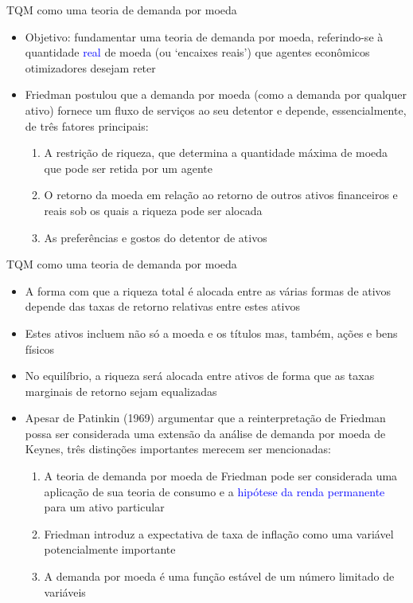 \documentclass[10pt]{beamer}
\begin{document}
\begin{frame}{TQM como uma teoria de demanda por moeda}
    \begin{itemize}
        \item Objetivo: fundamentar uma teoria de demanda por moeda, referindo-se à quantidade \textcolor{blue}{real} de moeda (ou `encaixes reais') que agentes econômicos otimizadores desejam reter
        \bigskip
        \item Friedman postulou que a demanda por moeda (como a demanda por qualquer ativo) fornece um fluxo de serviços ao seu detentor e depende, essencialmente, de três fatores principais:
        \bigskip
        \begin{enumerate}
            \item A restrição de riqueza, que determina a quantidade máxima de moeda que pode ser retida por um agente
            \medskip
            \item O retorno da moeda em relação ao retorno de outros ativos financeiros e reais sob os quais a riqueza pode ser alocada
            \bigskip
            \item As preferências e gostos do detentor de ativos
        \end{enumerate}
    \end{itemize}
\end{frame}

\begin{frame}{TQM como uma teoria de demanda por moeda}
    \begin{itemize}
        \item A forma com que a riqueza total é alocada entre as várias formas de ativos depende das taxas de retorno relativas entre estes ativos
        \bigskip
        \item Estes ativos incluem não só a moeda e os títulos mas, também, ações e bens físicos
        \bigskip
        \item No equilíbrio, a riqueza será alocada entre ativos de forma que as taxas marginais de retorno sejam equalizadas
        \bigskip
        \item Apesar de Patinkin (1969) argumentar que a reinterpretação de Friedman possa ser considerada uma extensão da análise de demanda por moeda de Keynes, três distinções importantes merecem ser mencionadas:
        \bigskip
        \begin{enumerate}
            \item A teoria de demanda por moeda de Friedman pode ser considerada uma aplicação de sua teoria de consumo e a \textcolor{blue}{hipótese da renda permanente} para um ativo particular
            \medskip
            \item Friedman introduz a expectativa de taxa de inflação como uma variável potencialmente importante
            \medskip
            \item A demanda por moeda é uma função estável de um número limitado de variáveis
        \end{enumerate}
    \end{itemize}
\end{frame}
\end{document}
